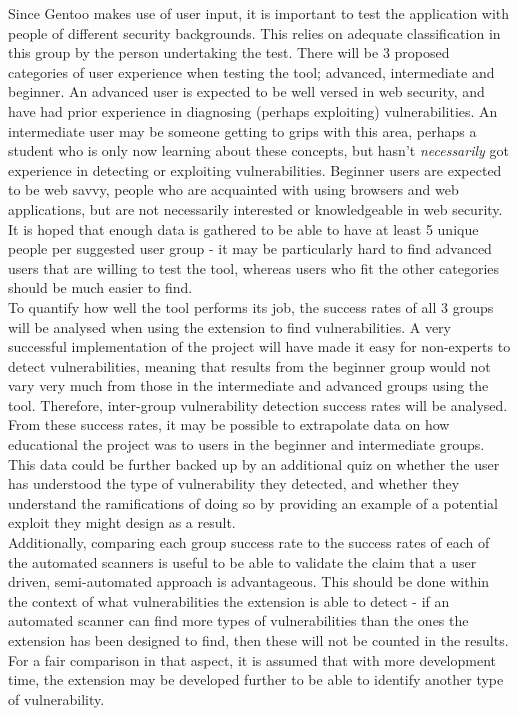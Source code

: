 Since Gentoo makes use of user input, it is important to test the application with people of different security backgrounds. This relies on adequate classification in this group by the person undertaking the test. There will be 3 proposed categories of user experience when testing the tool; advanced, intermediate and beginner. An advanced user is expected to be well versed in web security, and have had prior experience in diagnosing (perhaps exploiting) vulnerabilities. An intermediate user may be someone getting to grips with this area, perhaps a student who is only now learning about these concepts, but hasn't \emph{necessarily} got experience in detecting or exploiting vulnerabilities. Beginner users are expected to be web savvy, people who are acquainted with using browsers and web applications, but are not necessarily interested or knowledgeable in web security. It is hoped that enough data is gathered to be able to have at least 5 unique people per suggested user group - it may be particularly hard to find advanced users that are willing to test the tool, whereas users who fit the other categories should be much easier to find. \\

To quantify how well the tool performs its job, the success rates of all 3 groups will be analysed when using the extension to find vulnerabilities. A very successful implementation of the project will have made it easy for non-experts to detect vulnerabilities, meaning that results from the beginner group would not vary very much from those in the intermediate and advanced groups using the tool. Therefore, inter-group vulnerability detection success rates will be analysed. From these success rates, it may be possible to extrapolate data on how educational the project was to users in the beginner and intermediate groups. This data could be further backed up by an additional quiz on whether the user has understood the type of vulnerability they detected, and whether they understand the ramifications of doing so by providing an example of a potential exploit they might design as a result. \\

Additionally, comparing each group success rate to the success rates of each of the automated scanners is useful to be able to validate the claim that a user driven, semi-automated approach is advantageous. This should be done within the context of what vulnerabilities the extension is able to detect - if an automated scanner can find more types of vulnerabilities than the ones the extension has been designed to find, then these will not be counted in the results. For a fair comparison in that aspect, it is assumed that with more development time, the extension may be developed further to be able to identify another type of vulnerability. \\

